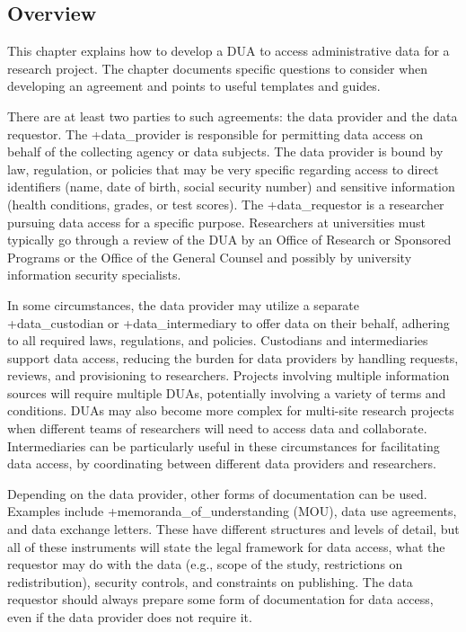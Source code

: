 \documentclass[
]{WileySix}
\begin{document}
\hypertarget{overview}{%
\subsection{Overview}\label{overview}}

This chapter explains how to develop a DUA to access administrative data for a research project. The chapter documents specific questions to consider when developing an agreement and points to useful templates and guides.

There are at least two parties to such agreements: the data provider and the data requestor. The +data\_provider\textbar{} is responsible for permitting data access on behalf of the collecting agency or data subjects. The data provider is bound by law, regulation, or policies that may be very specific regarding access to direct identifiers (name, date of birth, social security number) and sensitive information (health conditions, grades, or test scores). The +data\_requestor\textbar{} is a researcher pursuing data access for a specific purpose. Researchers at universities must typically go through a review of the DUA by an Office of Research or Sponsored Programs or the Office of the General Counsel and possibly by university information security specialists.

In some circumstances, the data provider may utilize a separate +data\_custodian\textbar{} or +data\_intermediary\textbar{} to offer data on their behalf, adhering to all required laws, regulations, and policies. Custodians and intermediaries support data access, reducing the burden for data providers by handling requests, reviews, and provisioning to researchers. Projects involving multiple information sources will require multiple DUAs, potentially involving a variety of terms and conditions. DUAs may also become more complex for multi-site research projects when different teams of researchers will need to access data and collaborate. Intermediaries can be particularly useful in these circumstances for facilitating data access, by coordinating between different data providers and researchers.

Depending on the data provider, other forms of documentation can be used. Examples include +memoranda\_of\_understanding\textbar{} (MOU), data use agreements, and data exchange letters. These have different structures and levels of detail, but all of these instruments will state the legal framework for data access, what the requestor may do with the data (e.g., scope of the study, restrictions on redistribution), security controls, and constraints on publishing. The data requestor should always prepare some form of documentation for data access, even if the data provider does not require it.
\end{document}
